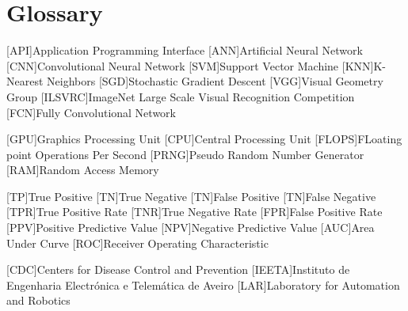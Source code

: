 \chapter{Glossary}

\footnotesize
\SingleSpacing

\begin{multicols}{2}
\begin{acronym}[AAAAAA]

	[API]{Application Programming Interface}
	[ANN]{Artificial Neural Network}
	[CNN]{Convolutional Neural Network}
    [SVM]{Support Vector Machine}
    [KNN]{K-Nearest Neighbors}
	[SGD]{Stochastic Gradient Descent}
	[VGG]{Visual Geometry Group}
    [ILSVRC]{ImageNet Large Scale Visual Recognition Competition}
    [FCN]{Fully Convolutional Network}
	
    [GPU]{Graphics Processing Unit}
	[CPU]{Central Processing Unit}
    [FLOPS]{FLoating point Operations Per Second}
	[PRNG]{Pseudo Random Number Generator}
	[RAM]{Random Access Memory}

    [TP]{True Positive}
    [TN]{True Negative}
    [TN]{False Positive}
    [TN]{False Negative}
    [TPR]{True Positive Rate}
    [TNR]{True Negative Rate}
    [FPR]{False Positive Rate}
    [PPV]{Positive Predictive Value}
    [NPV]{Negative Predictive Value}
    [AUC]{Area Under Curve}
    [ROC]{Receiver Operating Characteristic}
    
    [CDC]{Centers for Disease Control and Prevention}
    [IEETA]{Instituto de Engenharia Electrónica e Telemática de Aveiro}
    [LAR]{Laboratory for Automation and Robotics}

\end{acronym}
\end{multicols}
